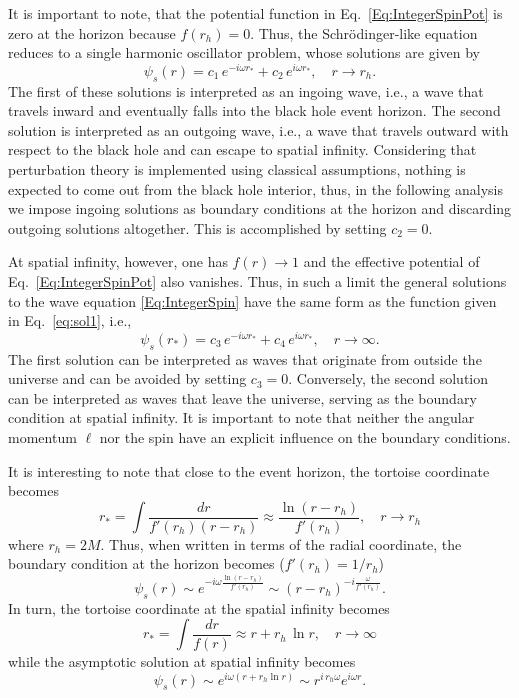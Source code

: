 It is important to note, that the potential function in Eq.~\eqref{Eq:IntegerSpinPot} is zero at the horizon because $f(r_h)=0$. Thus, the Schr\"odinger-like equation reduces to a single harmonic oscillator problem, whose solutions are given by
%
\begin{equation} \label{eq:sol1}
  \psi_{s}(r)=c_1\, e^{-i\omega r_*}+c_2\, e^{i\omega r_*}, \quad r\to r_h.
\end{equation}
%
The first of these solutions is interpreted as an ingoing wave, i.e., a wave that travels inward and eventually falls into the black hole event horizon. The second solution is interpreted as an outgoing wave, i.e., a wave that travels outward with respect to the black hole and can escape to spatial infinity. Considering that perturbation theory is implemented using classical assumptions, nothing is expected to come out from the black hole interior, thus, in the following analysis we impose ingoing solutions as boundary conditions at the horizon and discarding outgoing solutions altogether. This is accomplished by setting  $c_2=0$.

At spatial infinity, however, one has $f(r)\to 1$ and the effective potential of Eq.~\eqref{Eq:IntegerSpinPot} also vanishes. Thus, in such a limit the general solutions to the wave equation \eqref{Eq:IntegerSpin} have the same form as the function given in Eq.~\ref{eq:sol1}, i.e.,
%
\begin{equation}
  \psi_{s}(r_*)=c_3\, e^{-i\omega r_*}+c_4\, e^{i\omega r_*}, \quad r\to \infty.
\end{equation}
%
The first solution can be interpreted as waves that originate from outside the universe and can be avoided by setting $c_3=0$. Conversely, the second solution can be interpreted as waves that leave the universe, serving as the boundary condition at spatial infinity. It is important to note that neither the angular momentum $\ell$ nor the spin have an explicit influence on the boundary conditions.

It is interesting to note that close to the event horizon, the tortoise coordinate becomes
%
\begin{equation}
  r_*=\int \frac{dr}{f'(r_h)(r-r_h)}\approx \frac{\ln{(r-r_h)}}{ f'(r_h)},\quad r\to r_h
\end{equation}
where $r_h=2M$.
Thus, when written in terms of the radial coordinate, the boundary condition at the horizon becomes ($f'(r_h)=1/r_h$)
%
\begin{equation}
  \psi_s(r)\sim e^{-i\omega \frac{\ln{(r-r_h)}}{f'(r_h)}}\sim \left(r-r_h\right)^{-i\frac{\omega}{f'(r_h)}}.
\end{equation}
%
In turn, the tortoise coordinate at the spatial infinity becomes
%
\begin{equation}
  r_*=\int \frac{dr}{f(r)}\approx r+r_h\,\ln{r},\quad r\to \infty
\end{equation}
%
while the asymptotic solution at spatial infinity becomes
%
\begin{equation}
  \psi_s(r)\sim e^{i\omega(r+ r_h \ln{r})}\sim r^{i\, r_h\omega}e^{i\omega r}.
\end{equation}

